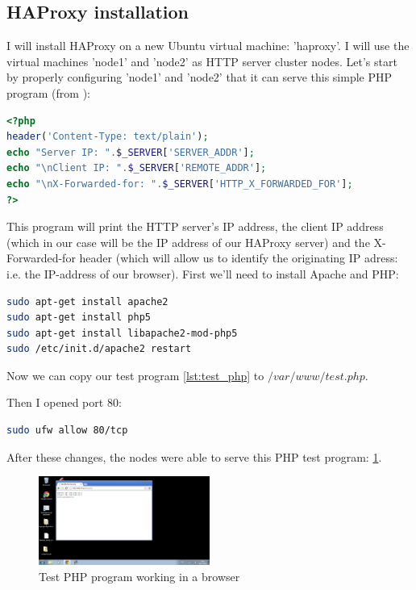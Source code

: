 \documentclass[12pt]{report}
\begin{document}
\subsection{HAProxy installation}
I will install HAProxy on a new Ubuntu virtual machine: 'haproxy'.
I will use the virtual machines 'node1' and 'node2' as HTTP server cluster nodes.
Let's start by properly configuring 'node1' and 'node2' that it can
serve this simple PHP program (from \cite{haproxy_install_tutorial}):
\label{lst:test_php}
\begin{lstlisting}[language=php]
<?php
header('Content-Type: text/plain');
echo "Server IP: ".$_SERVER['SERVER_ADDR'];
echo "\nClient IP: ".$_SERVER['REMOTE_ADDR'];
echo "\nX-Forwarded-for: ".$_SERVER['HTTP_X_FORWARDED_FOR'];
?>
\end{lstlisting} 
This program will print the HTTP server's IP address, the client IP
address (which in our case will be the IP address of our HAProxy
server) and the X-Forwarded-for header (which will allow us to identify
the originating IP adress: i.e. the IP-address of our browser).
First we'll need to install Apache and PHP:
\begin{lstlisting}[language=bash]
sudo apt-get install apache2
sudo apt-get install php5
sudo apt-get install libapache2-mod-php5
sudo /etc/init.d/apache2 restart
\end{lstlisting} 
Now we can copy our test program \ref{lst:test_php} to
$/var/www/test.php$.

Then I opened port 80:
\begin{lstlisting}[language=bash]
  sudo ufw allow 80/tcp
\end{lstlisting} 

After these changes, the nodes were able to serve this PHP test
program: \ref{fig:test_php_working}.

\begin{figure}[h!]
  \caption{Test PHP program working in a browser}
  \label{fig:test_php_working}
  \centering
    \includegraphics[width=0.5\textwidth]{pics/test_php_working.png}
\end{figure}
\end{document}
